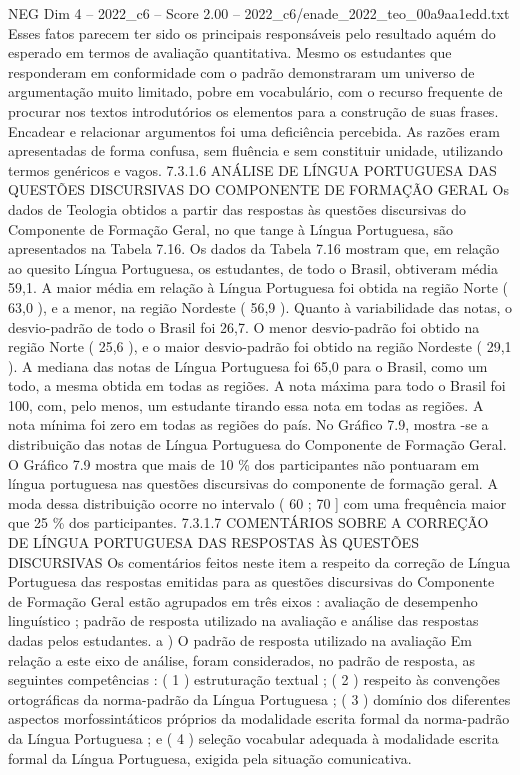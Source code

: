 \begin{textsample}{NEG Dim 4 – 2022\_c6 – Score 2.00 – 2022\_c6/enade\_2022\_teo\_00a9aa1edd.txt}
Esses fatos parecem ter sido os principais responsáveis pelo resultado aquém do esperado em termos de avaliação quantitativa.
Mesmo os estudantes que responderam em conformidade com o padrão demonstraram um universo de argumentação muito limitado, pobre em vocabulário, com o recurso frequente de procurar nos textos introdutórios os elementos para a construção de suas frases.
Encadear e relacionar argumentos foi uma deficiência percebida.
As razões eram apresentadas de forma confusa, sem fluência e sem constituir unidade, utilizando termos genéricos e vagos. 7.3.1.6 ANÁLISE DE LÍNGUA PORTUGUESA DAS QUESTÕES DISCURSIVAS DO COMPONENTE DE FORMAÇÃO GERAL Os dados de Teologia obtidos a partir das respostas às questões discursivas do Componente de Formação Geral, no que tange à Língua Portuguesa, são apresentados na Tabela 7.16.
Os dados da Tabela 7.16 mostram que, em relação ao quesito Língua Portuguesa, os estudantes, de todo o Brasil, obtiveram média 59,1.
A maior média em relação à Língua Portuguesa foi obtida na região Norte ( 63,0 ), e a menor, na região Nordeste ( 56,9 ).
Quanto à variabilidade das notas, o desvio-padrão de todo o Brasil foi 26,7.
O menor desvio-padrão foi obtido na região Norte ( 25,6 ), e o maior desvio-padrão foi obtido na região Nordeste ( 29,1 ).
A mediana das notas de Língua Portuguesa foi 65,0 para o Brasil, como um todo, a mesma obtida em todas as regiões.
A nota máxima para todo o Brasil foi 100, com, pelo menos, um estudante tirando essa nota em todas as regiões.
A nota mínima foi zero em todas as regiões do país.
No Gráfico 7.9, mostra -se a distribuição das notas de Língua Portuguesa do Componente de Formação Geral.
O Gráfico 7.9 mostra que mais de 10 \% dos participantes não pontuaram em língua portuguesa nas questões discursivas do componente de formação geral.
A moda dessa distribuição ocorre no intervalo ( 60 ; 70 ] com uma frequência maior que 25 \% dos participantes. 7.3.1.7 COMENTÁRIOS SOBRE A CORREÇÃO DE LÍNGUA PORTUGUESA DAS RESPOSTAS ÀS QUESTÕES DISCURSIVAS Os comentários feitos neste item a respeito da correção de Língua Portuguesa das respostas emitidas para as questões discursivas do Componente de Formação Geral estão agrupados em três eixos : avaliação de desempenho linguístico ; padrão de resposta utilizado na avaliação e análise das respostas dadas pelos estudantes. a ) O padrão de resposta utilizado na avaliação Em relação a este eixo de análise, foram considerados, no padrão de resposta, as seguintes competências : ( 1 ) estruturação textual ; ( 2 ) respeito às convenções ortográficas da norma-padrão da Língua Portuguesa ; ( 3 ) domínio dos diferentes aspectos morfossintáticos próprios da modalidade escrita formal da norma-padrão da Língua Portuguesa ; e ( 4 ) seleção vocabular adequada à modalidade escrita formal da Língua Portuguesa, exigida pela situação comunicativa.

\end{textsample}
